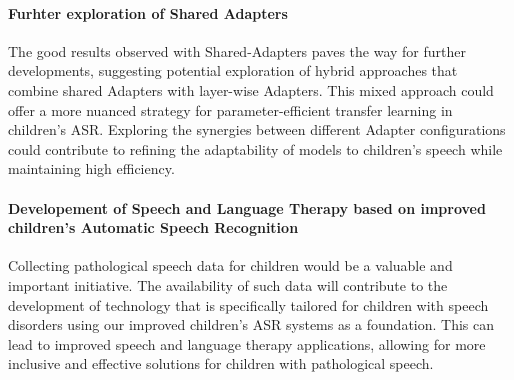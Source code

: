 \paragraph*{Furhter exploration of Shared Adapters} The good results observed with Shared-Adapters paves the way for further developments, suggesting potential exploration of hybrid approaches that combine shared Adapters with layer-wise Adapters. This mixed approach could offer a more nuanced strategy for parameter-efficient transfer learning in children's \ac{ASR}. Exploring the synergies between different Adapter configurations could contribute to refining the adaptability of models to children's speech while maintaining high efficiency.

\paragraph*{Developement of Speech and Language Therapy based on improved children's Automatic Speech Recognition} Collecting pathological speech data for children would be a valuable and important initiative. The availability of such data will contribute to the development of technology that is specifically tailored for children with speech disorders using our improved children's \ac{ASR} systems as a foundation. This can lead to improved speech and language therapy applications, allowing for more inclusive and effective solutions for children with pathological speech.